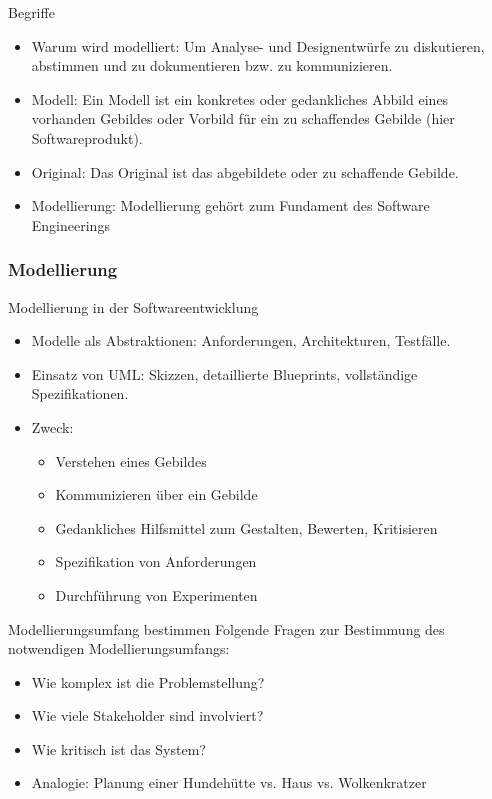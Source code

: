 \begin{definition}{Begriffe}
  \begin{itemize}
    \item Warum wird modelliert: Um Analyse- und Designentwürfe zu diskutieren, abstimmen und zu dokumentieren bzw. zu kommunizieren.
    \item Modell: Ein Modell ist ein konkretes oder gedankliches Abbild eines vorhanden Gebildes oder Vorbild für ein zu schaffendes Gebilde (hier Softwareprodukt).
    \item Original: Das Original ist das abgebildete oder zu schaffende Gebilde.
    \item Modellierung: Modellierung gehört zum Fundament des Software Engineerings
  \end{itemize}
\end{definition}

\subsubsection{Modellierung}

\begin{definition}{Modellierung in der Softwareentwicklung}
\begin{itemize}
    \item Modelle als Abstraktionen: Anforderungen, Architekturen, Testfälle.
    \item Einsatz von UML: Skizzen, detaillierte Blueprints, vollständige Spezifikationen.
    \item Zweck:
    \begin{itemize}
        \item Verstehen eines Gebildes
        \item Kommunizieren über ein Gebilde
        \item Gedankliches Hilfsmittel zum Gestalten, Bewerten, Kritisieren
        \item Spezifikation von Anforderungen
        \item Durchführung von Experimenten
    \end{itemize}
\end{itemize}
\end{definition}

\begin{KR}{Modellierungsumfang bestimmen}
Folgende Fragen zur Bestimmung des notwendigen Modellierungsumfangs:
\begin{itemize}
    \item Wie komplex ist die Problemstellung?
    \item Wie viele Stakeholder sind involviert?
    \item Wie kritisch ist das System?
    \item Analogie: Planung einer Hundehütte vs. Haus vs. Wolkenkratzer
\end{itemize}
\end{KR}

